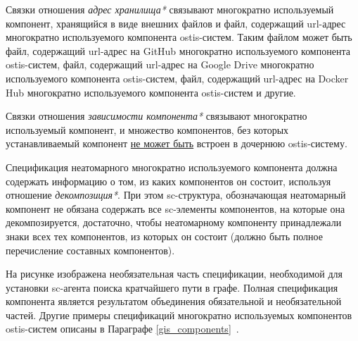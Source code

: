 Связки отношения \textit{адрес хранилища*} связывают многократно используемый компонент, хранящийся в виде внешних файлов и файл, содержащий url-адрес многократно используемого компонента ostis-систем. Таким файлом может быть файл, содержащий url-адрес на GitHub многократно используемого компонента ostis-систем, файл, содержащий url-адрес на Google Drive многократно используемого компонента ostis-систем, файл, содержащий url-адрес на Docker Hub многократно используемого компонента ostis-систем и другие.

Связки отношения \textit{зависимости компонента*} связывают многократно используемый компонент, и множество компонентов, без которых устанавливаемый компонент \underline{не может быть} встроен в дочернюю ostis-систему.

Спецификация неатомарного многократно используемого компонента должна содержать информацию о том, из каких компонентов он состоит, используя отношение \textit{декомпозиция*}. При этом sc-структура, обозначающая неатомарный компонент не обязана содержать все sc-элементы компонентов, на которые она декомпозируется, достаточно, чтобы неатомарному компоненту принадлежали знаки всех тех компонентов, из которых он состоит (должно быть полное перечисление составных компонентов).

На рисунке  изображена необязательная часть спецификации, необходимой для установки sc-агента поиска кратчайшего пути в графе. Полная спецификация компонента является результатом объединения обязательной и необязательной частей. Другие примеры спецификаций многократно используемых компонентов ostis-систем описаны в Параграфе \ref{gis_components}~.

